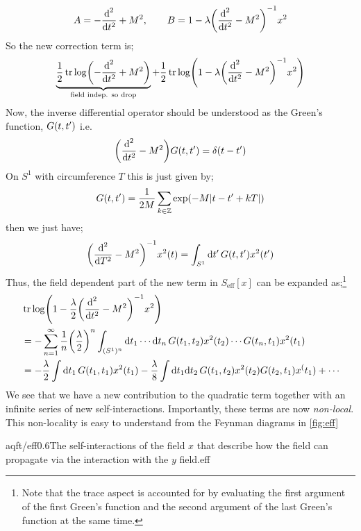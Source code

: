 \begin{equation*}
A = -\frac{\ud^2}{\ud t^2} + M^2, \qquad B = 1 - \lambda \left(\frac{\ud^2}{\ud t^2} - M^2\right)^{-1}x^2
\end{equation*}
So the new correction term is;
\begin{equation*}
\underbrace{\frac{1}{2}\tr\log\left(-\frac{\ud^2}{\ud t^2} + M^2\right)}_{\text{field indep. so drop}} + \frac{1}{2}\tr \log\left(1 - \lambda \left(\frac{\ud^2}{\ud t^2} - M^2\right)^{-1}x^2\right)
\end{equation*}
Now, the inverse differential operator should be understood as the Green's function, $G(t, t^{\prime})$ i.e.
\begin{equation*}
\left(\frac{\ud^2}{\ud t^2} - M^2\right)G(t, t\pr) = \delta(t - t\pr)
\end{equation*}
On $S^{1}$ with circumference $T$ this is just given by;
\begin{equation}
G(t, t\pr) = \frac{1}{2M}\sum_{k \in \ZZ}{\exp\left(-M\abs{t - t\pr + kT}\right)}
\end{equation}
then we just have;
\begin{equation*}
\left(\frac{\ud^2}{\ud T^2} - M^2\right)^{-1}x^2(t) = \int_{S^1}{\upd{t\pr}G(t, t\pr)x^2(t\pr)}
\end{equation*}
Thus, the field dependent part of the new term in $S_{\text{eff}}[x]$ can be expanded as;\footnote{Note that the trace aspect is accounted for by evaluating the first argument of the first Green's function and the second argument of the last Green's function at the same time.}
\begin{align*}
&\tr\log\left(1 - \frac{\lambda}{2}\left(\frac{\ud^2}{\ud t^2} - M^2\right)^{-1}x^2\right) \\
&= -\sum_{n = 1}^{\infty}{\frac{1}{n}\left(\frac{\lambda}{2}\right)^n}\int_{(S^1)^{n}}{\ud t_1 \cdots \upd{t_n} G(t_1, t_2)x^2(t_2)\cdots G(t_n, t_1)x^2(t_1)} \\
&= -\frac{\lambda}{2}\int{\upd{t_1}G(t_1, t_1)x^2(t_1)} - \frac{\lambda}{8}\int{\ud t_1 \upd{t_2}G(t_1, t_2)x^2(t_2)G(t_2, t_1)x^(t_1)} + \cdots
\end{align*}
We see that we have a new contribution to the quadratic term together with an infinite series of new self-interactions. Importantly, these terms are now \emph{non-local}. This non-locality is easy to understand from the Feynman diagrams in \autoref{fig:eff}
\begin{mygraphic}{aqft/eff}{0.6}{The self-interactions of the field $x$ that describe how the field can propagate via the interaction with the $y$ field.}{eff}\end{mygraphic}
